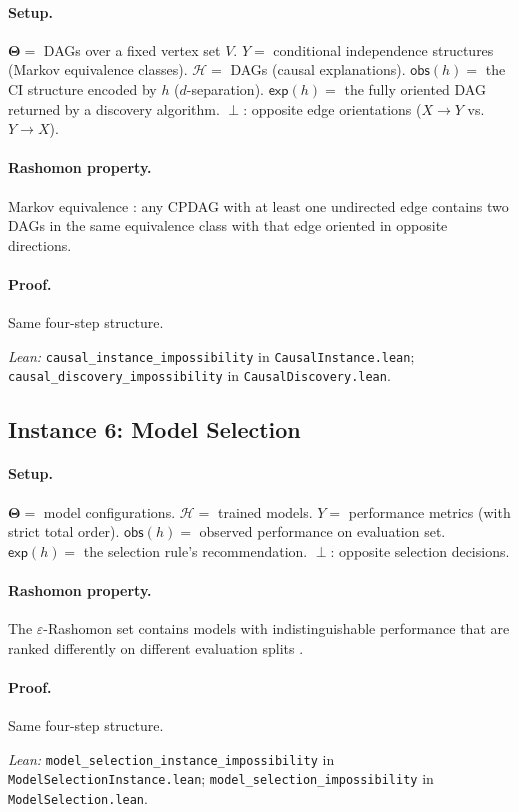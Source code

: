 \documentclass[11pt,a4paper]{article}
\newcommand{\Params}{\mathbf{\Theta}}
\newcommand{\sH}{\mathcal{H}}
\newcommand{\incomp}{\perp}
\begin{document}
\paragraph{Setup.}
$\Params ={}$ DAGs over a fixed vertex set $V$.
$Y ={}$ conditional independence structures (Markov equivalence classes).
$\sH ={}$ DAGs (causal explanations).
$\mathsf{obs}(h) ={}$ the CI structure encoded by $h$ ($d$-separation).
$\mathsf{exp}(h) ={}$ the fully oriented DAG returned by a discovery algorithm.
$\incomp$: opposite edge orientations ($X \to Y$ vs.\ $Y \to X$).

\paragraph{Rashomon property.}
Markov equivalence \citep{verma1991equivalence}: any CPDAG with at least one
undirected edge contains two DAGs in the same equivalence class with that edge
oriented in opposite directions.

\paragraph{Proof.}
Same four-step structure.

{\raggedright\noindent\textit{Lean:}
\texttt{causal\_instance\_impossibility} in
\texttt{CausalInstance.lean};
\texttt{causal\_discovery\_impossibility} in
\texttt{CausalDiscovery.lean}.\par}

\subsection{Instance 6: Model Selection}
\label{app:proof-model-selection}

\paragraph{Setup.}
$\Params ={}$ model configurations.
$\sH ={}$ trained models.
$Y ={}$ performance metrics (with strict total order).
$\mathsf{obs}(h) ={}$ observed performance on evaluation set.
$\mathsf{exp}(h) ={}$ the selection rule's recommendation.
$\incomp$: opposite selection decisions.

\paragraph{Rashomon property.}
The $\varepsilon$-Rashomon set contains models with indistinguishable
performance that are ranked differently on different evaluation splits
\citep{fisher2019models,rudin2024amazing,semenova2022existence}.

\paragraph{Proof.}
Same four-step structure.

{\raggedright\noindent\textit{Lean:}
\texttt{model\_selection\_instance\_impossibility}
in \texttt{ModelSelectionInstance.lean};
\texttt{model\_selection\_impossibility}
in \texttt{ModelSelection.lean}.\par}

\end{document}
